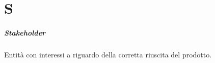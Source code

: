 \chapter{S}
\paragraph{Stakeholder}
Entità con interessi a riguardo della corretta riuscita del prodotto.

